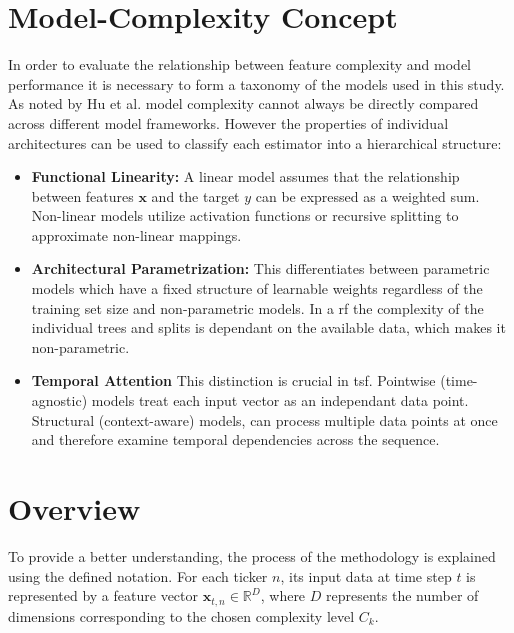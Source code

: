 \documentclass[12pt,twoside=false,a4paper,parskip]{scrbook}
\begin{document}
\section{Model-Complexity Concept}
In order to evaluate the relationship between feature complexity and model performance it is necessary to form a taxonomy of the models used in this study. As noted by Hu et al. \cite[p.3]{hu2021modelComplexitySurvey} model complexity cannot always be directly compared across different model frameworks. 
However the properties of individual architectures can be used to classify each estimator into a hierarchical structure:
\begin{itemize}
    \item \textbf{Functional Linearity:} A linear model assumes that the relationship between features $\boldsymbol{x}$ and the target $y$ can be expressed as a weighted sum. Non-linear models utilize activation functions or recursive splitting to approximate non-linear mappings.
    \item \textbf{Architectural Parametrization:} This differentiates between parametric models which have a fixed structure of learnable weights regardless of the training set size and non-parametric models. In a \gls{rf} the complexity of the individual trees and splits is dependant on the available data, which makes it non-parametric. 
    \item \textbf{Temporal Attention} This distinction is crucial in \gls{tsf}. Pointwise (time-agnostic) models treat each input vector as an independant data point. Structural (context-aware) models, can process multiple data points at once and therefore examine temporal dependencies across the sequence. 
\end{itemize}

\section{Overview}
\label{ch:overview}
To provide a better understanding, the process of the methodology is explained using the defined notation. For each ticker $n$, its input data at time step $t$ is represented by a feature vector $\mathbf{x}_{t,n} \in \mathbb{R}^D$, where $D$ represents the number of dimensions corresponding to the chosen complexity level $C_k$.
\end{document}
